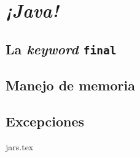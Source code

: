 \chapter{\textit{¡Java!}}
  \label{ch:java-2}
  \section{La \textit{keyword} \texttt{final}}
    \label{sec:final}
  \section{Manejo de memoria}
    \label{sec:memory}
  \section{Excepciones}
    \label{sec:exceptions}
  {jars.tex}
  \nocite{*}
  \printbibliography[keyword=java-3]
%
